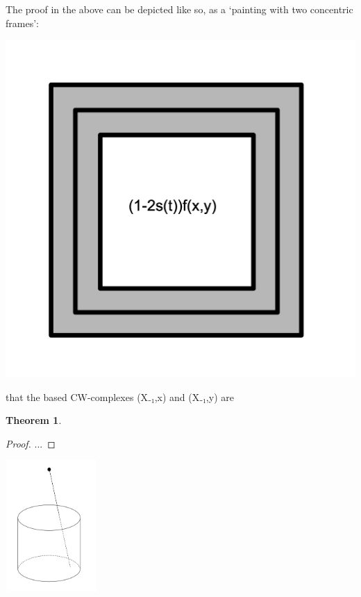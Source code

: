 \documentclass{book}
\theoremstyle{definition}
\newtheorem{theorem}{Theorem}
\begin{document}
The proof in the above can be depicted like so, as a `painting with two concentric frames':

\begin{center}
\includegraphics[scale=0.5]{windowframe.png}
\end{center}

that the based CW-complexes (X₋₁,x) and (X₋₁,y) are 

\begin{theorem}

\end{theorem}

\begin{proof}
...
\end{proof}

\begin{center}
\includegraphics[width=3.5cm,height=5cm]{proj.png}
\end{center}
\end{document}
